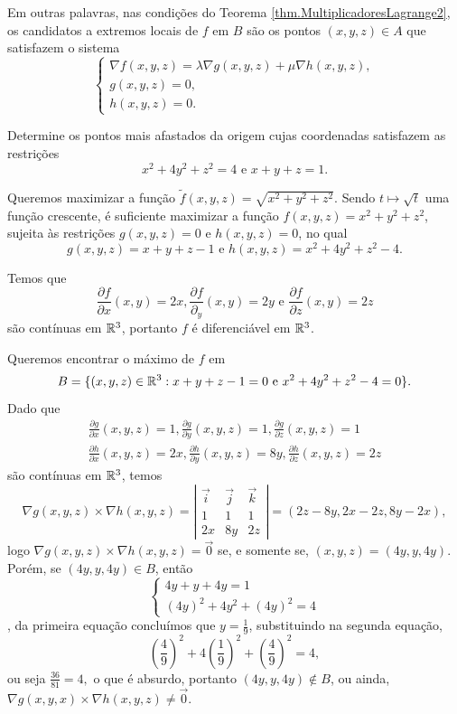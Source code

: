 Em outras palavras, nas condições do Teorema \ref{thm.MultiplicadoresLagrange2}, os candidatos a extremos locais de \(f\) em \(B\) são os pontos \((x,y,z)\in A\) que satisfazem o sistema \[\begin{cases}
    \nabla f(x,y,z) = \lambda \nabla g(x,y,z) + \mu \nabla h(x,y,z), \\
    g(x,y,z) = 0, \\
    h(x,y,z) = 0.
\end{cases}\]

\begin{example}
    Determine os pontos mais afastados da origem cujas coordenadas satisfazem as restrições \[x^2 + 4y^2 + z^2 = 4 \text{ e } x + y + z =1.\]

    Queremos maximizar a função \(\tilde{f}(x,y,z) = \sqrt{x^2 + y^2 + z^2}\). Sendo \(t\mapsto\sqrt{t}\) uma função crescente, é suficiente maximizar a função \(f(x,y,z) = x^2 + y^2 + z^2\), sujeita às restrições \(g(x,y,z) = 0\) e \(h(x,y,z) = 0\), no qual \[g(x,y,z) = x + y + z -1 \text{ e } h(x,y,z) = x^2 + 4y^2 + z^2 -4.\]

    Temos que \[\frac{\partial f}{\partial x}(x,y) = 2x, \frac{\partial f}{\partial_y}(x,y) = 2y \text{ e } \frac{\partial f}{\partial z}(x,y) = 2z\] são contínuas em \(\mathbb{R}^3\), portanto \(f\) é diferenciável em \(\mathbb{R}^3\).

    Queremos encontrar o máximo de \(f\) em \[B = \{(x,y,z)\in\mathbb{R}^3 : x + y + z -1 = 0 \text{ e } x^2 + 4y^2 + z^2 -4=0 \}.\] Dado que
        \begin{align*}
            \frac{\partial g}{\partial x}(x,y,z) = 1, \frac{\partial g}{\partial y}(x,y,z) = 1,  \frac{\partial g}{\partial z}(x,y,z) = 1 \\
            \frac{\partial h}{\partial x}(x,y,z) = 2x,  \frac{\partial h}{\partial y}(x,y,z) = 8y,  \frac{\partial h}{\partial z}(x,y,z) = 2z
        \end{align*}
    são contínuas em \(\mathbb{R}^3\), temos \[\nabla g(x,y,z) \times \nabla h(x,y,z) = \left|\begin{matrix}
        \overrightarrow{i} & \overrightarrow{j} & \overrightarrow{k} \\
        1 & 1 & 1 \\
        2x & 8y & 2z
    \end{matrix}\right| = (2z - 8y, 2x - 2z, 8y - 2x),\] logo \(\nabla g(x,y,z) \times \nabla h(x,y,z) = \overrightarrow{0}\) se, e somente se, \((x,y,z) = (4y, y, 4y)\). Porém, se \((4y,y,4y)\in B\), então \[\begin{cases}
        4y + y + 4y = 1 \\
        (4y)^2 + 4y^2 + (4y)^2 = 4
    \end{cases}\], da primeira equação concluímos que \(y = \frac{1}{9}\), substituindo na segunda equação, \[\left( \frac{4}{9} \right)^2 + 4\left( \frac{1}{9} \right)^2 + \left( \frac{4}{9} \right)^2 = 4,\] ou seja \(\frac{36}{81}=4,\) o que é absurdo, portanto \((4y,y,4y)\notin B\), ou ainda, \(\nabla g(x,y,x)\times \nabla h(x,y,z)\neq \overrightarrow{0}\).


\end{example}
